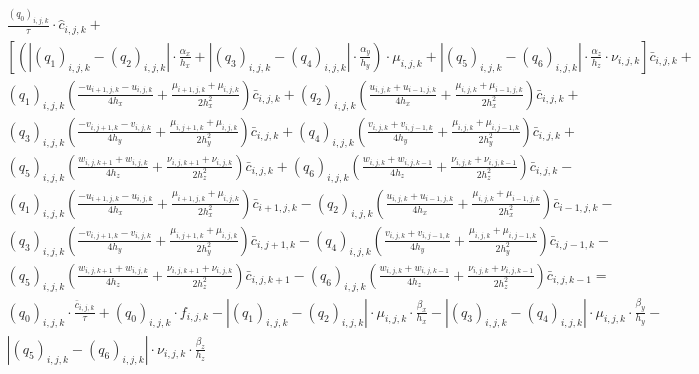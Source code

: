 \documentclass[12pt]{article}
\begin{document}
\begin{multline}
	\frac{(q_0)_{i,j,k}}{\tau}\cdot \hat{c}_{i,j,k} + \\
	\left[ \left( | (q_1)_{i,j,k} - (q_2)_{i,j,k}| \cdot \frac{\alpha_x}{h_x} + | (q_3)_{i,j,k} - (q_4)_{i,j,k}| \cdot \frac{\alpha_y}{h_y} \right) \cdot \mu_{i,j,k} + |(q_5)_{i,j,k} - (q_6)_{i,j,k}| \cdot \frac{\alpha_z}{h_z}\cdot \nu_{i,j,k} \right] \bar{c}_{i,j,k} + \\	
	(q_1)_{i,j,k} \left( \frac{-u_{i+1,j,k}- u_{i,j,k}  }{4h_x}  +	
	 \frac{\mu_{i+1,j,k}+ \mu_{i,j,k}}{2h_x^2} \right) \bar{c}_{i,j,k} + 
	 (q_2)_{i,j,k} \left( \frac{u_{i,j,k}+u_{i-1,j,k}}{4h_x} +	
	 \frac{\mu_{i,j,k}+\mu_{i-1,j,k}}{2h_x^2} \right) \bar{c}_{i,j,k} +	 \\
	(q_3)_{i,j,k} \left( \frac{-v_{i,j+1,k}-v_{i,j,k}}{4h_y}  + \frac{\mu_{i,j+1,k}+\mu_{i,j,k}}{2h_y^2} \right) \bar{c}_{i,j,k} + 	
	(q_4)_{i,j,k} \left( \frac{v_{i,j,k}+v_{i,j-1,k}}{4h_y}  + \frac{\mu_{i,j,k}+\mu_{i,j-1,k}}{2h_y^2} \right) \bar{c}_{i,j,k} +	\\
	(q_5)_{i,j,k} \left( \frac{w_{i,j,k+1}+w_{i,j,k}}{4h_z}  + \frac{\nu_{i,j,k+1}+\nu_{i,j,k}}{2h_z^2} \right) \bar{c}_{i,j,k} + 
	(q_6)_{i,j,k} \left( \frac{w_{i,j,k}+w_{i,j,k-1}}{4h_z}  + \frac{\nu_{i,j,k}+\nu_{i,j,k-1}}{2h_z^2} \right) \bar{c}_{i,j,k} - \\	
	(q_1)_{i,j,k} \left( \frac{-u_{i+1,j,k}-u_{i,j,k}}{4h_x}  + \frac{\mu_{i+1,j,k}+\mu_{i,j,k}}{2h_x^2} \right) \bar{c}_{i+1,j,k} -	
	(q_2)_{i,j,k} \left( \frac{u_{i,j,k}+u_{i-1,j,k}}{4h_x}  + \frac{\mu_{i,j,k}+\mu_{i-1,j,k}}{2h_x^2} \right) \bar{c}_{i-1,j,k} - \\	
	(q_3)_{i,j,k} \left( \frac{-v_{i,j+1,k}-v_{i,j,k}}{4h_y}  + \frac{\mu_{i,j+1,k}+\mu_{i,j,k}}{2h_y^2} \right) \bar{c}_{i,j+1,k} -		
	(q_4)_{i,j,k} \left( \frac{v_{i,j,k}+v_{i,j-1,k}}{4h_y}  + \frac{\mu_{i,j,k}+\mu_{i,j-1,k}}{2h_y^2} \right) \bar{c}_{i,j-1,k} - \\	
	(q_5)_{i,j,k} \left(\frac{w_{i,j,k+1}+w_{i,j,k}}{4h_z}  + \frac{\nu_{i,j,k+1}+\nu_{i,j,k}}{2h_z^2} \right) \bar{c}_{i,j,k+1} -	
	(q_6)_{i,j,k} \left(\frac{w_{i,j,k}+w_{i,j,k-1}}{4h_z}  + \frac{\nu_{i,j,k}+\nu_{i,j,k-1}}{2h_z^2} \right) \bar{c}_{i,j,k-1} = \\
	(q_0)_{i,j,k}\cdot \frac{\bar{c}_{i,j,k}}{\tau} + (q_0)_{i,j,k}\cdot f_{i,j,k} -
	| (q_1)_{i,j,k} - (q_2)_{i,j,k}| \cdot \mu_{i,j,k}\cdot \frac{\beta_x}{h_x} - 
	| (q_3)_{i,j,k} - (q_4)_{i,j,k}| \cdot \mu_{i,j,k}\cdot \frac{\beta_y}{h_y} - \\
	| (q_5)_{i,j,k} - (q_6)_{i,j,k}| \cdot \nu_{i,j,k}\cdot \frac{\beta_z}{h_z}
\end{multline}
\end{document}
